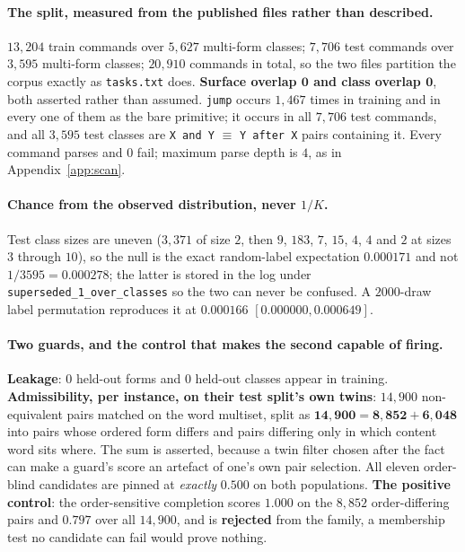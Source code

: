 \paragraph{The split, measured from the published files rather than described.} $13{,}204$ train commands over $5{,}627$ multi-form classes; $7{,}706$ test commands over $3{,}595$ multi-form classes; $20{,}910$ commands in total, so the two files partition the corpus exactly as \texttt{tasks.txt} does. \textbf{Surface overlap $\mathbf{0}$ and class overlap $\mathbf{0}$}, both asserted rather than assumed. \texttt{jump} occurs $1{,}467$ times in training and in every one of them as the bare primitive; it occurs in all $7{,}706$ test commands, and all $3{,}595$ test classes are \texttt{X and Y} $\equiv$ \texttt{Y after X} pairs containing it. Every command parses and $0$ fail; maximum parse depth is $4$, as in Appendix~\ref{app:scan}.

\paragraph{Chance from the observed distribution, never $1/K$.} Test class sizes are uneven ($3{,}371$ of size $2$, then $9$, $183$, $7$, $15$, $4$, $4$ and $2$ at sizes $3$ through $10$), so the null is the exact random-label expectation $0.000171$ and not $1/3595 = 0.000278$; the latter is stored in the log under \texttt{superseded\_1\_over\_classes} so the two can never be confused. A $2000$-draw label permutation reproduces it at $0.000166$ $[0.000000,0.000649]$.

\paragraph{Two guards, and the control that makes the second capable of firing.} \textbf{Leakage}: $0$ held-out forms and $0$ held-out classes appear in training. \textbf{Admissibility, per instance, on their test split's own twins}: $14{,}900$ non-equivalent pairs matched on the word multiset, split as $\mathbf{14{,}900 = 8{,}852 + 6{,}048}$ into pairs whose ordered form differs and pairs differing only in which content word sits where. The sum is asserted, because a twin filter chosen after the fact can make a guard's score an artefact of one's own pair selection. All eleven order-blind candidates are pinned at \emph{exactly} $0.500$ on both populations. \textbf{The positive control}: the order-sensitive completion scores $1.000$ on the $8{,}852$ order-differing pairs and $0.797$ over all $14{,}900$, and is \textbf{rejected} from the family, a membership test no candidate can fail would prove nothing.

